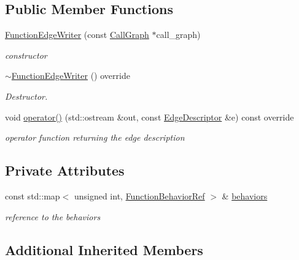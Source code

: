 \subsection*{Public Member Functions}
\begin{DoxyCompactItemize}
\item 
\hyperlink{classFunctionEdgeWriter_ac4ea641ac563ef834f68da6da35465e8}{Function\+Edge\+Writer} (const \hyperlink{classCallGraph}{Call\+Graph} $\ast$call\+\_\+graph)
\begin{DoxyCompactList}\small\item\em constructor \end{DoxyCompactList}\item 
\hyperlink{classFunctionEdgeWriter_aebd3f659a0ad7263d6326d26124e300b}{$\sim$\+Function\+Edge\+Writer} () override
\begin{DoxyCompactList}\small\item\em Destructor. \end{DoxyCompactList}\item 
void \hyperlink{classFunctionEdgeWriter_afadc175ca3b7ff6076556dc850cacfa2}{operator()} (std\+::ostream \&out, const \hyperlink{graph_8hpp_a9eb9afea34e09f484b21f2efd263dd48}{Edge\+Descriptor} \&e) const override
\begin{DoxyCompactList}\small\item\em operator function returning the edge description \end{DoxyCompactList}\end{DoxyCompactItemize}
\subsection*{Private Attributes}
\begin{DoxyCompactItemize}
\item 
const std\+::map$<$ unsigned int, \hyperlink{function__behavior_8hpp_affbc6a46ab86ddfabe31c10986d333dc}{Function\+Behavior\+Ref} $>$ \& \hyperlink{classFunctionEdgeWriter_ab994325dc215a5201871172807d41de9}{behaviors}
\begin{DoxyCompactList}\small\item\em reference to the behaviors \end{DoxyCompactList}\end{DoxyCompactItemize}
\subsection*{Additional Inherited Members}


